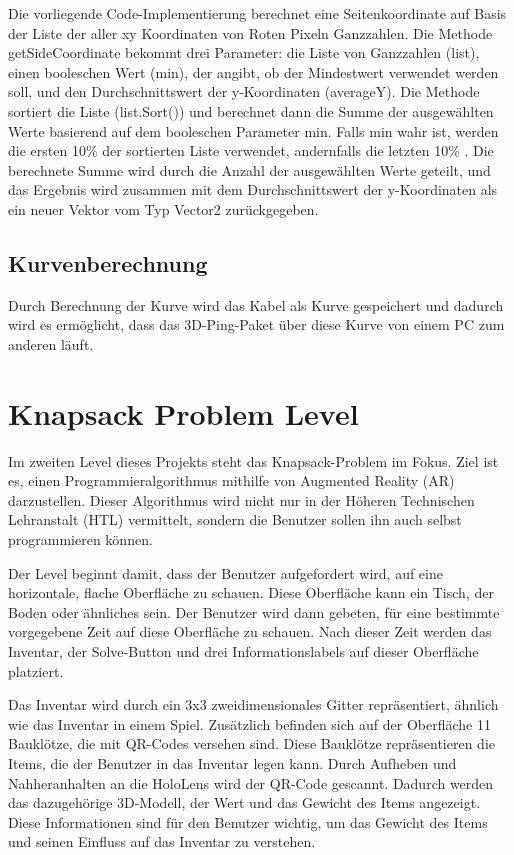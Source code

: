 Die vorliegende Code-Implementierung berechnet eine Seitenkoordinate auf Basis der Liste der aller xy
Koordinaten von Roten Pixeln Ganzzahlen. Die Methode getSideCoordinate bekommt drei Parameter: die
Liste von Ganzzahlen (list), einen booleschen Wert (min), der angibt, ob der Mindestwert verwendet werden soll, und den Durchschnittswert der
y-Koordinaten (averageY). Die Methode sortiert die Liste (list.Sort()) und berechnet dann die Summe der
ausgewählten Werte basierend auf dem booleschen Parameter min. Falls min wahr ist, werden die ersten 10\% der
sortierten Liste verwendet, andernfalls die letzten 10\% . Die berechnete Summe wird durch die Anzahl der
ausgewählten Werte geteilt, und das Ergebnis wird zusammen mit dem Durchschnittswert der y-Koordinaten als ein
neuer Vektor vom Typ Vector2 zurückgegeben.



\subsection{Kurvenberechnung}
Durch Berechnung der Kurve wird das Kabel als Kurve gespeichert
und dadurch wird es ermöglicht, dass das 3D-Ping-Paket über diese
Kurve von einem PC zum anderen läuft.


\section{Knapsack Problem Level}
Im zweiten Level dieses Projekts steht das Knapsack-Problem im Fokus.
Ziel ist es, einen Programmieralgorithmus mithilfe von Augmented Reality
(AR) darzustellen. Dieser Algorithmus wird nicht nur in der Höheren
Technischen Lehranstalt (HTL) vermittelt, sondern die Benutzer sollen
ihn auch selbst programmieren können.

Der Level beginnt damit, dass der Benutzer aufgefordert wird, auf eine
horizontale, flache Oberfläche zu schauen. Diese Oberfläche kann ein Tisch,
der Boden oder ähnliches sein. Der Benutzer wird dann gebeten, für eine bestimmte
vorgegebene Zeit auf diese Oberfläche zu schauen. Nach dieser Zeit werden das Inventar,
der Solve-Button und drei Informationslabels auf dieser Oberfläche platziert.

Das Inventar wird durch ein 3x3 zweidimensionales Gitter repräsentiert, ähnlich
wie das Inventar in einem Spiel. Zusätzlich befinden sich auf der Oberfläche 11 Bauklötze,
die mit QR-Codes versehen sind. Diese Bauklötze repräsentieren die Items, die der Benutzer
in das Inventar legen kann. Durch Aufheben und Nahheranhalten an die HoloLens wird der QR-Code gescannt.
Dadurch werden das dazugehörige 3D-Modell, der Wert und das Gewicht des Items angezeigt.
Diese Informationen sind für den Benutzer wichtig, um das Gewicht des Items und
seinen Einfluss auf das Inventar zu verstehen.


